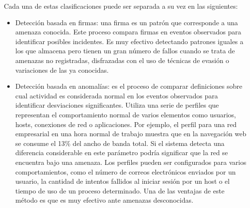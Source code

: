 Cada una de estas clasificaciones puede ser separada a su vez en las siguientes:

\begin{itemize}
    \item Detección basada en firmas: una firma es un patrón que corresponde a una amenaza conocida. Este proceso compara firmas en eventos observados para identificar posibles incidentes. Es muy efectivo detectando patrones iguales a los que almacena pero tienen un gran número de fallos cuando se trata de amenazas no registradas, disfrazadas con el uso de técnicas de evasión o variaciones de las ya conocidas.
    \item Detección basada en anomalías: es el proceso de comparar definiciones sobre cual actividad es considerada normal en los eventos observados para identificar desviaciones significantes. Utiliza una serie de perfiles que representan el comportamiento normal de varios elementos como usuarios, hosts, conexiones de red o aplicaciones. Por ejemplo, el perfil para una red empresarial en una hora normal de trabajo muestra que en la navegación web se consume el 13\% del ancho de banda total. Si el sistema detecta una diferencia considerable en este parámetro podría significar que la red se encuentra bajo una amenaza. Los perfiles pueden ser configurados para varios comportamientos, como el número de correos electrónicos enviados por un usuario, la cantidad de intentos fallidos al iniciar sesión por un host o el tiempo de uso de un proceso determinado. Una de las ventajas de este método es que es muy efectivo ante amenazas desconocidas.

\end{itemize}
